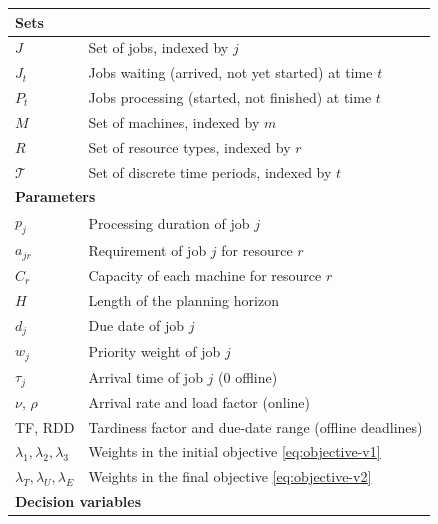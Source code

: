 \documentclass[12pt]{article}
\providecommand{\DIFaddbeginFL}{} %
\providecommand{\DIFdelendFL}{} %
\providecommand{\DIFaddincludegraphics}[2][]{{\color{blue}\fbox{\DIFOincludegraphics[#1]{#2}}}} %
\DeclareRobustCommand{\DIFaddbeginFL}{\DIFOaddbeginFL \let\includegraphics\DIFaddincludegraphics} %
\DeclareRobustCommand{\DIFdelendFL}{\DIFOaddendFL \let\includegraphics\DIFOincludegraphics} %
\begin{document}
\begin{table}[htbp]
\DIFdelendFL \DIFaddbeginFL \begin{tabular}{ll}
\toprule
\multicolumn{2}{l}{\textbf{Sets}}\\
\midrule
$J$ & Set of jobs, indexed by $j$ \\
$J_t$ & Jobs waiting (arrived, not yet started) at time $t$ \\
$P_t$ & Jobs processing (started, not finished) at time $t$ \\
$M$ & Set of machines, indexed by $m$ \\
$R$ & Set of resource types, indexed by $r$ \\
$\mathcal{T}$ & Set of discrete time periods, indexed by $t$ \\
\midrule
\multicolumn{2}{l}{\textbf{Parameters}}\\
\midrule
$p_j$ & Processing duration of job $j$ \\
$a_{jr}$ & Requirement of job $j$ for resource $r$ \\
$C_r$ & Capacity of each machine for resource $r$ \\
$H$ & Length of the planning horizon \\
$d_j$ & Due date of job $j$ \\
$w_j$ & Priority weight of job $j$ \\
$\tau_j$ & Arrival time of job $j$ ($0$ offline) \\
$\nu$, $\rho$ & Arrival rate and load factor (online) \\
TF, RDD & Tardiness factor and due-date range (offline deadlines) \\
$\lambda_1, \lambda_2, \lambda_3$ & Weights in the initial objective \cref{eq:objective-v1} \\
$\lambda_T, \lambda_U, \lambda_E$ & Weights in the final objective \cref{eq:objective-v2} \\
\midrule
\multicolumn{2}{l}{\textbf{Decision variables}}\\

\end{tabular}
\end{table}
\end{document}
